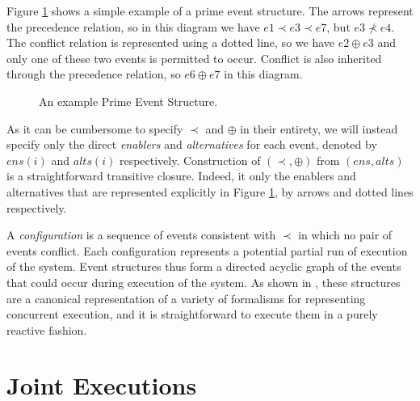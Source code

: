 Figure \ref{fig:example-pes} shows a simple example of a prime event
structure. The arrows represent the precedence relation, so in this
diagram we have $e1\prec e3\prec e7$, but $e3\not\prec e4$. The
conflict relation is represented using a dotted line, so we have $e2\oplus e3$
and only one of these two events is permitted to occur. Conflict is
also inherited through the precedence relation, so $e6\oplus e7$
in this diagram.

%
\begin{figure}
\begin{centering}
\par\end{centering}

\caption{An example Prime Event Structure.}


\label{fig:example-pes} 
\end{figure}


As it can be cumbersome to specify $\prec$ and $\oplus$ in their
entirety, we will instead specify only the direct \emph{enablers}
and \emph{alternatives} for each event, denoted by $ens(i)$ and $alts(i)$
respectively. Construction of $(\prec,\oplus)$ from $(ens,alts)$
is a straightforward transitive closure. Indeed, it only the enablers
and alternatives that are represented explicitly in Figure \ref{fig:example-pes},
by arrows and dotted lines respectively.

A \emph{configuration} is a sequence of events consistent with $\prec$
in which no pair of events conflict. Each configuration represents
a potential partial run of execution of the system. Event structures
thus form a directed acyclic graph of the events that could occur
during execution of the system. As shown in \citep{pratt91modeling_conc_with_geom},
these structures are a canonical representation of a variety of formalisms
for representing concurrent execution, and it is straightforward to
execute them in a purely reactive fashion.


\section{Joint Executions\label{sec:JointExec:JEs}}

